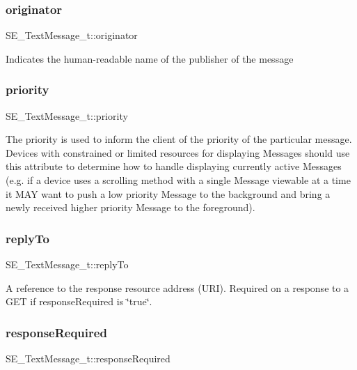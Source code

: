 \subsubsection{\texorpdfstring{originator}{originator}}
{\footnotesize\ttfamily S\+E\+\_\+\+Text\+Message\+\_\+t\+::originator}

Indicates the human-\/readable name of the publisher of the message \mbox{\label{group__TextMessage_gabaf18bd2a16c44de5f1c0be141c8d841}} 
\subsubsection{\texorpdfstring{priority}{priority}}
{\footnotesize\ttfamily S\+E\+\_\+\+Text\+Message\+\_\+t\+::priority}

The priority is used to inform the client of the priority of the particular message. Devices with constrained or limited resources for displaying Messages should use this attribute to determine how to handle displaying currently active Messages (e.\+g. if a device uses a scrolling method with a single Message viewable at a time it M\+AY want to push a low priority Message to the background and bring a newly received higher priority Message to the foreground). \mbox{\label{group__TextMessage_gaef01814e071285a1c298efe3d7f04ad8}} 
\subsubsection{\texorpdfstring{reply\+To}{replyTo}}
{\footnotesize\ttfamily S\+E\+\_\+\+Text\+Message\+\_\+t\+::reply\+To}

A reference to the response resource address (U\+RI). Required on a response to a G\+ET if response\+Required is \char`\"{}true\char`\"{}. \mbox{\label{group__TextMessage_gaef788047a5043fd8cdba5706dd69c868}} 
\subsubsection{\texorpdfstring{response\+Required}{responseRequired}}
{\footnotesize\ttfamily S\+E\+\_\+\+Text\+Message\+\_\+t\+::response\+Required}

